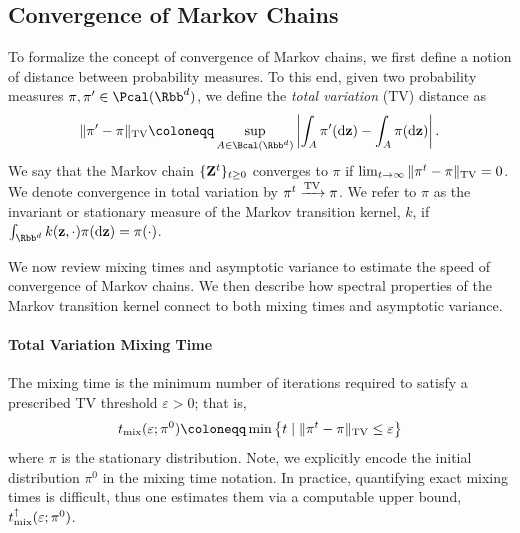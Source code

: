 \documentclass[onefignum,onetabnum]{siamonline250211}
\renewcommand{\d} {{\rm d}}                                %
\newcommand{\bfZ}{{\bf Z}}
\newcommand{\bfz}{{\bf z}}
\begin{document}
\subsection{Convergence of Markov Chains}
\label{sec:convergence_markov_chains}
To formalize the concept of convergence of Markov chains, we first define a notion of distance between probability measures.
To this end, given two probability measures $\pi, \pi' \in \Pcal(\Rbb^d)$, we define the \emph{total variation} (TV) distance as
\begin{align}\label{eq:tv_dist}
        \|\pi' - \pi\|_{\rm TV} \coloneqq \sup_{A\in \Bcal(\Rbb^d)} \left|\int_A \pi'(\d\bfz) - \int_A \pi(\d\bfz)\right|.
\end{align}
%
%
We say that the Markov chain $\{\bfZ^t\}_{t\ge 0}$ converges to $\pi$ if $\lim_{t\to\infty}\|\pi^t-\pi\|_{\rm TV}=0$.
%
We denote convergence in total variation by $\pi^t \xrightarrow{\rm TV} \pi$.
We refer to $\pi$ as the invariant or stationary measure of the Markov transition kernel, $k$, if $\int_{\Rbb^d} k(\bfz,\cdot)\pi(\d\bfz)=\pi(\cdot)$.
%
%
%
%


We now review mixing times and asymptotic variance to estimate the speed of convergence of Markov chains.
We then describe how spectral properties of the Markov transition kernel connect to both mixing times and asymptotic variance.
%

%
%

\paragraph{Total Variation Mixing Time}
%
%
%
The mixing time is the minimum number of iterations required to satisfy a prescribed TV threshold $\varepsilon > 0$; that is,
    \begin{align}\label{eq:mixing_time}
        t_{\rm mix}(\varepsilon; \pi^0) \coloneqq \min\left\{t \mid \|\pi^t - \pi\|_{\rm TV}\le \varepsilon\right\}
\end{align}
where $\pi$ is the stationary distribution.
%
Note, we explicitly encode the initial distribution $\pi^0$ in the mixing time notation. 
In practice, quantifying exact mixing times is difficult, thus one estimates them via a computable upper bound, $ t_{\rm mix}^\uparrow(\varepsilon; \pi^0)$.
\end{document}
